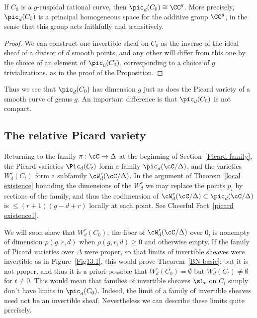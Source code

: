 \begin{corollary}
If $C_{0}$ is a $g$-cuspidal rational curve, then $\pic_{d}(C_{0}) \cong \CC^{g}$. More precisely,
$\pic_{d}(C_{0})$ is a principal homogeneous space for the additive group $\CC^{g}$, in the sense that
this group acts faithfully and transitively.
\end{corollary}
\begin{proof}
We can construct one invertible sheaf on $C_{0}$ as the inverse of the ideal sheaf of a divisor of $d$ smooth points, and any other will differ from this one by the choice of an element of $\pic_{0}(C_{0})$,
corresponding to a choice of $g$ trivializations, as in the proof of the Proposition. \end{proof}

Thus we see that $\pic_{d}(C_{0})$ has dimension $g$ just as does the Picard variety of a smooth curve
of genus $g$. An important difference is that $\pic_{d}(C_{0})$ is not compact.

\subsection{The relative Picard variety}

Returning to the family $\pi : \cC \to \Delta$ at the beginning of Section~\ref{Picard family}, the Picard varieties $\Pic_d(C_t)$ form a family $\pic_d(\cC/\Delta)$, and the varieties $W^r_d(C_t)$ form a subfamily $\cW^r_d(\cC/\Delta)$.  In the argument
of Theorem~\ref{local existence} bounding  the dimensions of the $W^r_d$
we may replace the points $p_i$ by sections of the family, and thus
the codimension of $\cW^r_d(\cC/\Delta) \subset \pic_d(\cC/\Delta)$ is $\leq (r+1)(g-d+r)$ locally at each point. See 
Cheerful Fact~\ref{picard existence1}.

We will soon show that $W^{r}_{d}(C_{0})$, the fiber of $\cW^{r}_{d}(\cC/\Delta)$ over 0,  is nonempty of dimension $\rho(g,r,d)$ when $\rho(g,r,d)\geq 0$ and otherwise empty. If the family of Picard varieties over $\Delta$ were proper, so that limits of invertible sheaves were invertible as in Figure~\ref{Fig13.1},
this would prove Theorem~\ref{BN-basic}; but it is not proper, and thus it is a priori possible that $W^{r}_{d}(C_{0})=\emptyset$ but $W^{r}_{d}(C_{t})\neq \emptyset$ for $t\neq 0$. This would mean that families of invertible sheaves $\sL_{t}$ on $C_{t}$  simply don't have  limits
in $\pic_{d}(C_{0})$. Indeed, the limit of a family of invertible sheaves need not be an invertible
sheaf. Nevertheless we can describe these limits quite precisely.

